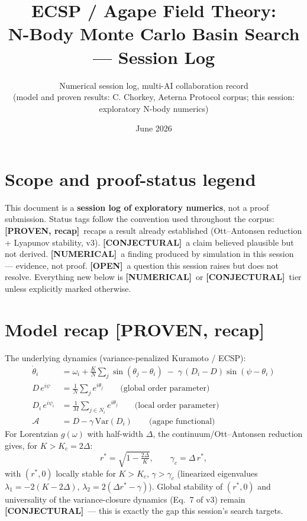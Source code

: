 \documentclass[11pt]{article}
\title{ECSP / Agape Field Theory:\\ N-Body Monte Carlo Basin Search --- Session Log}
\author{Numerical session log, multi-AI collaboration record\\ \small (model and proven results: C. Chorkey, Aeterna Protocol corpus; this session: exploratory N-body numerics)}
\date{June 2026}
\newcommand{\PROVEN}{\textbf{\textcolor{green!40!black}{[PROVEN, recap]}}}
\newcommand{\CONJ}{\textbf{\textcolor{orange!70!black}{[CONJECTURAL]}}}
\newcommand{\NUM}{\textbf{\textcolor{blue!60!black}{[NUMERICAL]}}}
\newcommand{\OPEN}{\textbf{\textcolor{red!60!black}{[OPEN]}}}
\begin{document}
\maketitle

\section*{Scope and proof-status legend}
This document is a \textbf{session log of exploratory numerics}, not a proof submission. Status tags follow the convention used throughout the corpus:
\PROVEN\ recaps a result already established (Ott--Antonsen reduction + Lyapunov stability, v3).
\CONJ\ a claim believed plausible but not derived.
\NUM\ a finding produced by simulation in this session --- evidence, not proof.
\OPEN\ a question this session raises but does not resolve.
Everything new below is \NUM\ or \CONJ\ tier unless explicitly marked otherwise.

\section{Model recap \PROVEN}
The underlying dynamics (variance-penalized Kuramoto / ECSP):
\begin{align}
\dot\theta_i &= \omega_i + \frac{K}{N}\sum_j \sin(\theta_j-\theta_i) \;-\; \gamma\,(D_i - D)\sin(\psi-\theta_i) \label{eq:1}\\
D\,e^{i\psi} &= \frac{1}{N}\sum_j e^{i\theta_j} \qquad\text{(global order parameter)}\label{eq:2}\\
D_i\,e^{i\psi_i} &= \frac{1}{M}\sum_{j\in N_i} e^{i\theta_j} \qquad\text{(local order parameter)}\label{eq:3}\\
\mathcal{A} &= D - \gamma\,\mathrm{Var}(D_i) \qquad\text{(agape functional)}\label{eq:4}
\end{align}
For Lorentzian $g(\omega)$ with half-width $\Delta$, the continuum/Ott--Antonsen reduction gives, for $K>K_c=2\Delta$:
\begin{equation}
r^\ast = \sqrt{1-\tfrac{2\Delta}{K}}, \qquad \gamma_c = \Delta\, r^\ast,
\end{equation}
with $(r^\ast,0)$ locally stable for $K>K_c$, $\gamma>\gamma_c$ (linearized eigenvalues $\lambda_1=-2(K-2\Delta)$, $\lambda_2 = 2(\Delta r^\ast - \gamma)$). Global stability of $(r^\ast,0)$ and universality of the variance-closure dynamics (Eq.~7 of v3) remain \CONJ\ --- this is exactly the gap this session's search targets.
\end{document}
